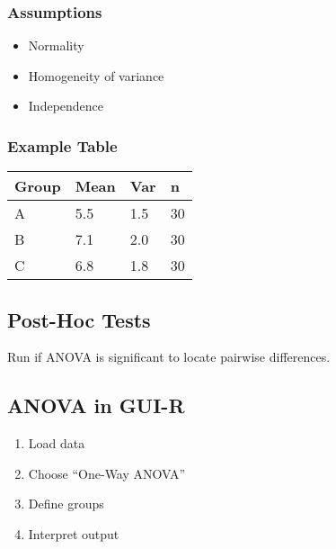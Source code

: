 \documentclass[
  letterpaper,
  DIV=11,
  numbers=noendperiod]{scrreprt}
\providecommand{\tightlist}{%
  \setlength{\itemsep}{0pt}\setlength{\parskip}{0pt}}
\begin{document}
\subsubsection{Assumptions}\label{assumptions}

\begin{itemize}
\tightlist
\item
  Normality\\
\item
  Homogeneity of variance\\
\item
  Independence
\end{itemize}

\subsubsection{Example Table}\label{example-table}

\begin{longtable}[]{@{}llll@{}}
\toprule\noalign{}
Group & Mean & Var & n \\
\midrule\noalign{}
\endhead
\bottomrule\noalign{}
\endlastfoot
A & 5.5 & 1.5 & 30 \\
B & 7.1 & 2.0 & 30 \\
C & 6.8 & 1.8 & 30 \\
\end{longtable}

\subsection{Post-Hoc Tests}\label{post-hoc-tests}

Run if ANOVA is significant to locate pairwise differences.

\subsection{ANOVA in GUI-R}\label{anova-in-gui-r}

\begin{enumerate}
\def\labelenumi{\arabic{enumi}.}
\tightlist
\item
  Load data\\
\item
  Choose ``One-Way ANOVA''\\
\item
  Define groups\\
\item
  Interpret output
\end{enumerate}
\end{document}
